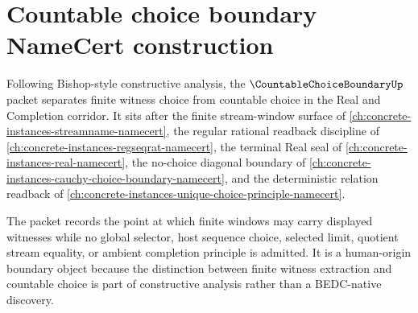 \chapter{Countable choice boundary NameCert construction}
\label{ch:concrete-instances-countable-choice-boundary-namecert}

Following Bishop-style constructive analysis, the $\CountableChoiceBoundaryUp$ packet separates finite witness choice from countable choice in the Real and Completion corridor. It sits after the finite stream-window surface of \autoref{ch:concrete-instances-streamname-namecert}, the regular rational readback discipline of \autoref{ch:concrete-instances-regseqrat-namecert}, the terminal Real seal of \autoref{ch:concrete-instances-real-namecert}, the no-choice diagonal boundary of \autoref{ch:concrete-instances-cauchy-choice-boundary-namecert}, and the deterministic relation readback of \autoref{ch:concrete-instances-unique-choice-principle-namecert}.

The packet records the point at which finite windows may carry displayed witnesses while no global selector, host sequence choice, selected limit, quotient stream equality, or ambient completion principle is admitted. It is a human-origin boundary object because the distinction between finite witness extraction and countable choice is part of constructive analysis rather than a BEDC-native discovery.

